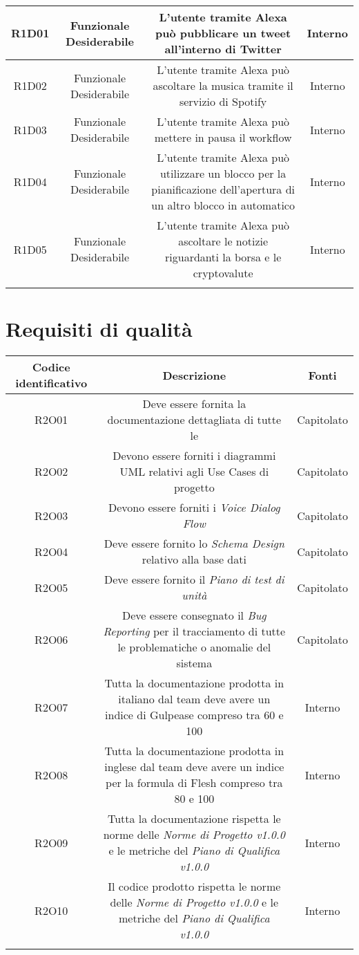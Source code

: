 \begin{tabularx}{\textwidth}{|C|C|C|C|}
	\hline
	R1D01&Funzionale Desiderabile  &L'utente tramite Alexa può pubblicare un tweet all'interno di Twitter &Interno \\
	\hline
	R1D02&Funzionale Desiderabile  &L'utente tramite Alexa può ascoltare la musica tramite il servizio di Spotify &Interno \\
	\hline
	R1D03&Funzionale Desiderabile  &L'utente tramite Alexa può mettere in pausa il workflow &Interno \\
	\hline
	R1D04&Funzionale Desiderabile  &L'utente tramite Alexa può utilizzare un blocco per la pianificazione dell'apertura di un altro blocco in automatico &Interno \\
	\hline
	R1D05&Funzionale Desiderabile  &L'utente tramite Alexa può ascoltare le notizie riguardanti la borsa e le cryptovalute &Interno \\
	\hline
	\caption{Tabella requisiti funzionali}
\end{tabularx}


\section{Requisiti di qualità}
\begin{tabularx}{\textwidth}{|C|C|C|}
	\hline
	\textbf{Codice identificativo} & \textbf{Descrizione} & \textbf{Fonti} \\
	\hline
	\endhead
	R2O01 & Deve essere fornita la documentazione dettagliata di tutte le  & Capitolato\\
	\hline
	R2O02 & Devono essere forniti i diagrammi UML relativi agli Use Cases di progetto  & Capitolato\\
	\hline
	R2O03 & Devono essere forniti i \textit{Voice Dialog Flow} & Capitolato\\
	\hline
	R2O04 & Deve essere fornito lo \textit{Schema Design} relativo alla base dati  & Capitolato\\
	\hline
	R2O05 & Deve essere fornito il \textit{Piano di test di unità} & Capitolato\\
	\hline
	R2O06 & Deve essere consegnato il \textit{Bug Reporting} per il tracciamento di
	tutte le problematiche o anomalie del sistema & Capitolato\\
	\hline
	R2O07 & Tutta la documentazione prodotta in italiano dal team deve avere
	un indice di Gulpease compreso tra 60 e 100 & Interno\\
	\hline
	R2O08 & Tutta la documentazione prodotta in inglese dal team deve avere
	un indice per la formula di Flesh compreso tra 80 e 100 & Interno\\
	\hline
	R2O09 & Tutta la documentazione rispetta le norme delle \textit{Norme di Progetto v1.0.0} e le metriche del \textit{Piano di Qualifica v1.0.0}& Interno\\
	\hline
	R2O10 & Il codice prodotto rispetta le norme delle \textit{Norme di Progetto v1.0.0} e le metriche del \textit{Piano di Qualifica v1.0.0}& Interno\\
	\hline
    \caption{Tabella requisiti di qualità}
\end{tabularx}

